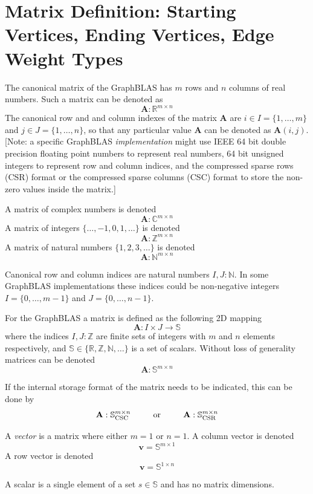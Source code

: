 \section{Matrix Definition: Starting Vertices, Ending Vertices, Edge Weight Types}
  The canonical matrix of the GraphBLAS has $m$ rows and $n$ columns of real numbers.  Such a matrix can be denoted as
$$
  \mathbf{A}: \mathbb{R}^{m \times n}
$$
The canonical row and and column indexes of the matrix $\mathbf{A}$ are $i \in I = \{1,\ldots,m\}$ and $j \in J = \{1,\ldots,n\}$, so that any particular value $\mathbf{A}$ can be denoted as $\mathbf{A}(i,j)$.  [Note: a specific GraphBLAS \emph{implementation} might use IEEE 64 bit double precision floating point numbers to represent real numbers, 64 bit unsigned integers to represent row and column indices, and the compressed sparse rows (CSR) format or the compressed sparse columns (CSC) format to store the non-zero values inside the matrix.]

  A matrix of complex numbers is denoted
$$
  \mathbf{A}: \mathbb{C}^{m \times n}
$$
  A matrix of integers $\{\ldots, -1, 0, 1, \ldots\}$ is denoted
$$
  \mathbf{A}: \mathbb{Z}^{m \times n}
$$
  A matrix of natural numbers $\{1, 2, 3, \ldots\}$ is denoted
$$
  \mathbf{A}: \mathbb{N}^{m \times n}
$$

  Canonical row and column indices are natural numbers $I,J : \mathbb{N}$.  In some GraphBLAS implementations these indices could be non-negative integers  $I = \{0,\ldots,m-1\}$ and $J = \{0,\ldots,n-1\}$.
  
  For the GraphBLAS a matrix is defined as the following 2D mapping
$$
  \mathbf{A} : I \times J \rightarrow \mathbb{S}
$$
where the indices $I, J : \mathbb{Z}$ are finite sets of integers with $m$ and $n$ elements respectively, and  $\mathbb{S} \in \{\mathbb{R},\mathbb{Z},\mathbb{N}, \ldots \}$ is a set of scalars.  Without loss of generality matrices can be denoted
$$
  \mathbf{A}: \mathbb{S}^{m \times n}
$$

If the internal storage format of the matrix needs to be indicated, this can be done by
$$
  \mathbf{A}: \mathbb{S}^{m \times n}_{\rm CSC}  ~~~~~~~~ {\rm or}  ~~~~~~~~ 
  \mathbf{A}: \mathbb{S}^{m \times n}_{\rm CSR}
$$

  A \emph{vector} is a matrix where either $m=1$ or $n=1$. A column vector is denoted
$$
 \mathbf{v} = \mathbb{S}^{m \times 1}
$$
  A row vector is denoted
$$
  \mathbf{v} = \mathbb{S}^{1 \times n}
$$

  A scalar is a single element of a set $s \in \mathbb{S}$ and has no matrix dimensions.

